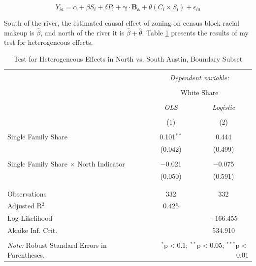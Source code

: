 \documentclass[11pt]{article}
\begin{document}
\begin{equation} \label{eqn:full_model_FEs_riverhetero}
    Y_{ia}=\alpha+\beta S_i+\delta P_i+\boldsymbol{\gamma}\cdot\boldsymbol{B_a}+\theta (C_i \times S_i)+\epsilon_{ia}
\end{equation}

South of the river, the estimated causal effect of zoning on census block racial makeup is $\hat{\beta}$, and north of the river it is $\hat{\beta}+\hat{\theta}$. Table \ref{tab:river_heteroeneity} presents the results of my test for heterogeneous effects.

\begin{table}[!htbp] \centering 
  \caption{Test for Heterogeneous Effects in North vs. South Austin, Boundary Subset} 
  \label{tab:river_heteroeneity} 
\begin{tabular}{@{\extracolsep{5pt}}lcc} 
\\[-1.8ex]\hline 
\hline \\[-1.8ex] 
 & \multicolumn{2}{c}{\textit{Dependent variable:}} \\ 
\cline{2-3} 
\\[-1.8ex] & \multicolumn{2}{c}{White Share} \\ 
\\[-1.8ex] & \textit{OLS} & \textit{Logistic} \\ 
\\[-1.8ex] & (1) & (2)\\ 
\hline \\[-1.8ex] 
 Single Family Share & 0.101$^{**}$ & 0.444 \\ 
  & (0.042) & (0.499) \\ 
  & & \\ 
 Single Family Share $\times$ North Indicator & $-$0.021 & $-$0.075 \\ 
  & (0.050) & (0.591) \\ 
  & & \\ 
\hline \\[-1.8ex] 
Observations & 332 & 332 \\ 
Adjusted R$^{2}$ & 0.425 &  \\ 
Log Likelihood &  & $-$166.455 \\ 
Akaike Inf. Crit. &  & 534.910 \\ 
\hline 
\hline \\[-1.8ex] 
\textit{Note:} Robust Standard Errors in Parentheses.  & \multicolumn{2}{r}{$^{*}$p$<$0.1; $^{**}$p$<$0.05; $^{***}$p$<$0.01} \\ 
\end{tabular} 
\end{table}
\end{document}

